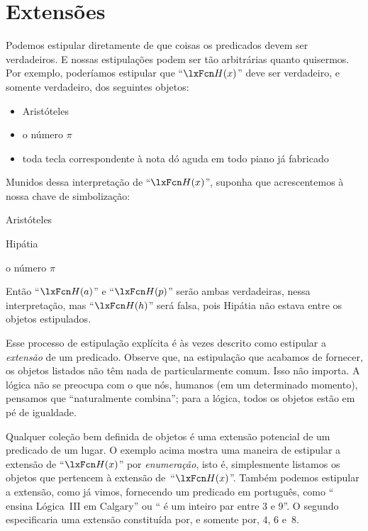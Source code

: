 \section{Extensões}\label{sec:extensions}
Podemos estipular diretamente de que coisas os predicados devem ser verdadeiros. E nossas estipulações podem ser tão arbitrárias quanto quisermos. Por exemplo, poderíamos estipular que \textquotedblleft $\atom{H}{x}$\textquotedblright{} deve ser verdadeiro, e somente verdadeiro, dos seguintes objetos:
	\begin{itemize}
		\item Aristóteles
		\item o número $\pi$
\item toda tecla correspondente à nota dó aguda em todo piano já fabricado
	\end{itemize}
Munidos dessa interpretação de \textquotedblleft $\atom{H}{x}$\textquotedblright{}, suponha que acrescentemos à nossa chave de simbolização:
	\begin{ekey}
		\item[a] Aristóteles
		\item[h] Hipátia
		\item[p] o número $\pi$
	\end{ekey}
Então \textquotedblleft $\atom{H}{a}$\textquotedblright{} e \textquotedblleft $\atom{H}{p}$\textquotedblright{} serão ambas verdadeiras, nessa interpretação, mas \textquotedblleft $\atom{H}{h}$\textquotedblright{} será falsa, pois Hipátia não estava entre os objetos estipulados.

Esse processo de estipulação explícita é às vezes descrito como estipular a \emph{extensão} de um predicado. Observe que, na estipulação que acabamos de fornecer, os objetos listados não têm nada de particularmente comum. Isso não importa. A lógica não se preocupa com o que nós, humanos (em um determinado momento), pensamos que \textquotedblleft naturalmente combina\textquotedblright{}; para a lógica, todos os objetos estão em pé de igualdade.

Qualquer coleção bem definida de objetos é uma extensão potencial de um predicado de um lugar. O exemplo acima mostra uma maneira de estipular a extensão de \textquotedblleft $\atom{H}{x}$\textquotedblright{} por \emph{enumeração}, isto é, simplesmente listamos os objetos que pertencem à extensão de~\textquotedblleft $\atom{H}{x}$\textquotedblright{}. Também podemos estipular a extensão, como já vimos, fornecendo um predicado em português, como \textquotedblleft {} ensina Lógica~III em Calgary\textquotedblright{} ou \textquotedblleft {} é um inteiro par entre $3$ e $9$\textquotedblright{}. O segundo especificaria uma extensão constituída por, e somente por, $4$, $6$ e~$8$.

